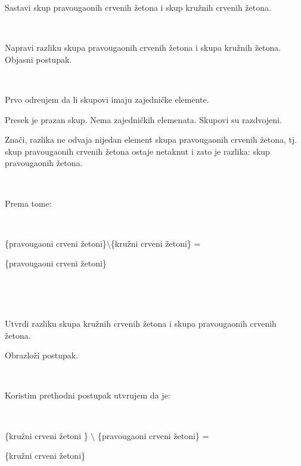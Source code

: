     \begin{zad} 

        Sastavi skup pravougaonih crvenih \v zetona i skup kru\v znih crvenih \v zetona.

        \

        Napravi razliku skupa pravougaonih crvenih \v zetona i skupa kru\v znih \v zetona. Objasni postupak.

        \ 

        

        Prvo odre\dj ujem da li skupovi imaju zajedni\v cke elemente. 

        

        Presek je prazan skup. Nema zajedni\v ckih elemenata. Skupovi su razdvojeni. 

        

        Zna\v ci, razlika ne odvaja nijedan element skupa pravougaonih crvenih \v zetona, tj. skup pravougaonih crvenih \v zetona ostaje netaknut i zato je razlika: skup pravougaonih \v zetona. 

        \ 

        

        Prema tome: 

        \ 

        

        \{pravougaoni  crveni \v zetoni\}$\setminus$\{kru\v zni  crveni  \v zetoni\} = \

        \{pravougaoni crveni \v zetoni\}

        \

        \ 

        Utvrdi razliku skupa kru\v znih crvenih \v zetona i skupa pravougaonih crvenih \v zetona.

        Obrazlo\v zi postupak. 

        \  

        

        Koristim prethodni postupak utvr\dj ujem da je: 

        \ 

        

        \{kru\v zni crveni \v zetoni \} $\setminus$ \{pravougaoni crveni \v zetoni\} = \

        \{kru\v zni crveni \v zetoni\}

    \end{zad}

